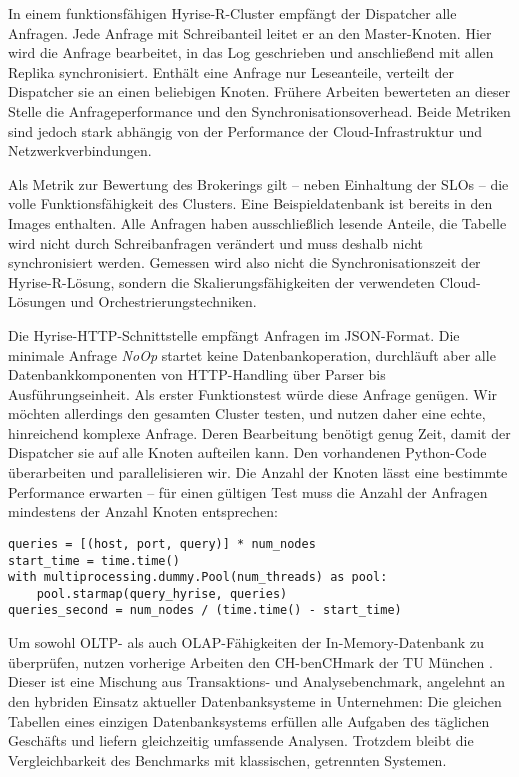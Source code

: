 
In einem funktionsfähigen Hyrise-R-Cluster empfängt der Dispatcher alle Anfragen. Jede Anfrage mit Schreibanteil leitet er an den Master-Knoten. Hier wird die Anfrage bearbeitet, in das Log geschrieben und anschließend mit allen Replika synchronisiert. Enthält eine Anfrage nur Leseanteile, verteilt der Dispatcher sie an einen beliebigen Knoten. Frühere Arbeiten bewerteten an dieser Stelle die Anfrageperformance und den Synchronisationsoverhead. Beide Metriken sind jedoch stark abhängig von der Performance der Cloud-Infrastruktur und Netzwerkverbindungen.

Als Metrik zur Bewertung des Brokerings gilt -- neben Einhaltung der SLOs -- die volle Funktionsfähigkeit des Clusters. Eine Beispieldatenbank ist bereits in den Images enthalten. Alle Anfragen haben ausschließlich lesende Anteile, die Tabelle wird nicht durch Schreibanfragen verändert und muss deshalb nicht synchronisiert werden. Gemessen wird also nicht die Synchronisationszeit der Hyrise-R-Lösung, sondern die Skalierungsfähigkeiten der verwendeten Cloud-Lösungen und Orchestrierungstechniken.

Die Hyrise-HTTP-Schnittstelle empfängt Anfragen im JSON-Format. Die minimale Anfrage \emph{NoOp} startet keine Datenbankoperation, durchläuft aber alle Datenbankkomponenten von HTTP-Handling über Parser bis Ausführungseinheit. Als erster Funktionstest würde diese Anfrage genügen. Wir möchten allerdings den gesamten Cluster testen, und nutzen daher eine echte, hinreichend komplexe Anfrage. Deren Bearbeitung benötigt genug Zeit, damit der Dispatcher sie auf alle Knoten aufteilen kann. Den vorhandenen Python-Code überarbeiten und parallelisieren wir. Die Anzahl der Knoten lässt eine bestimmte Performance erwarten -- für einen gültigen Test muss die Anzahl der Anfragen mindestens der Anzahl Knoten entsprechen:

\begin{verbatim}
queries = [(host, port, query)] * num_nodes
start_time = time.time()
with multiprocessing.dummy.Pool(num_threads) as pool:
	pool.starmap(query_hyrise, queries)
queries_second = num_nodes / (time.time() - start_time)
\end{verbatim}

Um sowohl OLTP- als auch OLAP-Fähigkeiten der In-Memory-Datenbank zu überprüfen, nutzen vorherige Arbeiten \cite{ssiclops:d42:experiments-measurements} den CH-benCHmark der TU München \cite{cole:2011:db-benchmark}. Dieser ist eine Mischung aus Transaktions- und Analysebenchmark, angelehnt an den hybriden Einsatz aktueller Datenbanksysteme in Unternehmen: Die gleichen Tabellen eines einzigen Datenbanksystems erfüllen alle Aufgaben des täglichen Geschäfts und liefern gleichzeitig umfassende Analysen. Trotzdem bleibt die Vergleichbarkeit des Benchmarks mit klassischen, getrennten Systemen.

